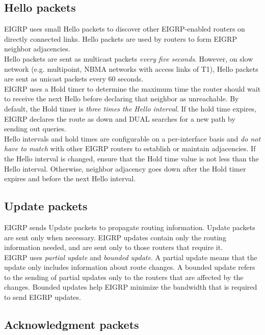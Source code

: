 \subsection{Hello packets}

EIGRP uses small Hello packets to discover other EIGRP-enabled routers on directly connected links. Hello packets are used by routers to form EIGRP neighbor adjacencies.\\
 
Hello packets are sent as multicast packets \emph{every five seconds}. However, on slow network (e.g. multipoint, NBMA networks with access links of T1), Hello packets are sent as unicast packets every 60 seconds.\\
 
EIGRP uses a Hold timer to determine the maximum time the router should wait to receive the next Hello before declaring that neighbor as unreachable. By default, the Hold timer is \emph{three times the Hello interval}. If the hold time expires, EIGRP declares the route as down and DUAL searches for a new path by sending out queries.\\

Hello intervals and hold times are configurable on a per-interface basis and \emph{do not have to match} with other EIGRP routers to establish or maintain adjacencies. If the Hello interval is changed, ensure that the Hold time value is not less than the Hello interval. Otherwise, neighbor adjacency goes down after the Hold timer expires and before the next Hello interval. 

\subsection{Update packets}

EIGRP sends Update packets to propagate routing information. Update packets are sent only when necessary. EIGRP updates contain only the routing information needed, and are sent only to those routers that require it.\\
 
EIGRP uses \emph{partial update} and \emph{bounded update}. A partial update means that the update only includes information about route changes. A bounded update refers to the sending of partial updates only to the routers that are affected by the changes. Bounded updates help EIGRP minimize the bandwidth that is required to send EIGRP updates.

\subsection{Acknowledgment packets}

